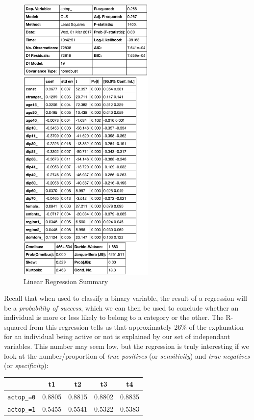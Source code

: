 \begin{figure}
    \centering
    \includegraphics[width=0.6\textwidth]{img/linear_regression_summary}
    \caption{Linear Regression Summary}
    \label{fig:linear_regression_summary}
\end{figure}

Recall that when used to classify a binary variable, the result of a regression will be a \textit{probability of success}, which we can then be used to conclude whether an individual is more or less likely to belong to a category or the other. The R-squared from this regression tells us that approximately 26\% of the explanation for an individual being active or not is explained by our set of independant variables. This number may seem low, but the regression is truly interesting if we look at the number/proportion of \textit{true positives} (or \textit{sensitivity}) and \textit{true negatives} (or \textit{specificity}):

\begin{center}
    \begin{tabular}{lcccc}
        \hline
                           & t1     & t2     & t3     & t4     \\
        \hline
        \texttt{actop\_=0} & 0.8805 & 0.8815 & 0.8802 & 0.8835 \\
        \texttt{actop\_=1} & 0.5455 & 0.5541 & 0.5322 & 0.5383 \\
    \end{tabular}
\end{center}

